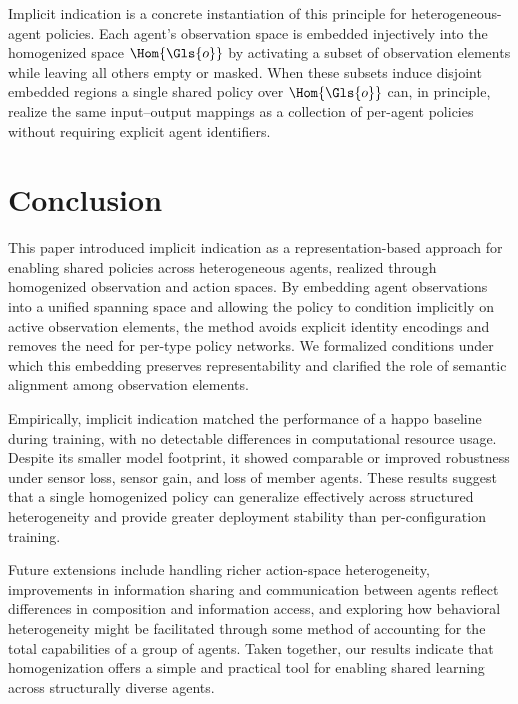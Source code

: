 Implicit indication is a concrete instantiation of this
principle for heterogeneous-agent policies. Each agent's observation space is
embedded injectively into the homogenized space \(\Hom{\Gls{o}}\) by activating a subset
of observation elements while leaving all others empty or masked. 
When these subsets induce disjoint embedded regions a single shared policy 
over \(\Hom{\Gls{o}}\) can, in principle, realize the same input--output mappings 
as a collection of per-agent policies without requiring explicit agent identifiers.

\section{Conclusion}
\label{con2:sec:conclusion}

This paper introduced implicit indication as a representation-based approach
for enabling shared policies across heterogeneous agents, realized through
homogenized observation and action spaces. By embedding agent observations into a unified
spanning space and allowing the policy to condition implicitly on active
observation elements, the method avoids explicit identity encodings and
removes the need for per-type policy networks. We formalized conditions
under which this embedding preserves representability and clarified the
role of semantic alignment among observation elements.

Empirically, implicit indication matched the performance of a
\gls{happo} baseline during training, with no detectable
differences in computational resource usage. 
Despite its smaller model footprint, it showed comparable 
or improved robustness under sensor loss, sensor gain,
and loss of member agents. These results suggest that a
single homogenized policy can generalize effectively across 
structured heterogeneity and provide greater deployment 
stability than per-configuration training.

Future extensions include handling richer action-space heterogeneity,
improvements in information sharing and communication between agents 
reflect differences in composition and information access,
and exploring how behavioral heterogeneity might be facilitated
through some method of accounting for the total capabilities of 
a group of agents. 
Taken together, our
results indicate that homogenization offers a simple and practical tool
for enabling shared learning across structurally diverse agents.
